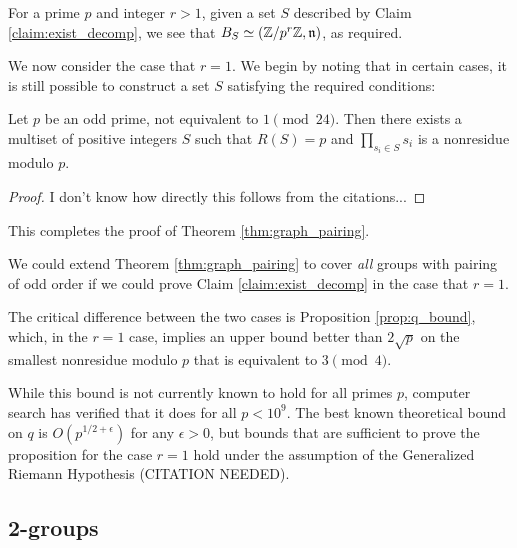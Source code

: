 \documentclass{amsart}
\begin{document}
For a prime $p$ and integer $r > 1$, given a set $S$ described by
Claim \ref{claim:exist_decomp}, we see that $B_S \simeq (\mathbb{Z}/p^r\mathbb{Z},
\mathfrak{n})$, as required.

We now consider the case that $r=1$. We begin by noting that in
certain cases, it is still possible to construct a set $S$
satisfying the required conditions:
\begin{prop}
  Let $p$ be an odd prime, not equivalent to $1 \pmod {24}$. Then
  there exists a multiset of positive integers $S$ such that $R(S) =
  p$ and $\prod_{s_i \in S}s_i$ is a nonresidue modulo $p$.
\end{prop}
\begin{proof}
  I don't know how directly this follows from the citations...
\end{proof}

This completes the proof of Theorem \ref{thm:graph_pairing}.

\begin{remark} We could extend Theorem \ref{thm:graph_pairing} to
  cover \emph{all} groups with pairing of odd order if we could prove
  Claim \ref{claim:exist_decomp} in the case that $r=1$.
  
  The critical difference between the two cases is Proposition
  \ref{prop:q_bound}, which, in the $r=1$ case, implies an upper bound
  better than $2\sqrt{p}$ on the smallest nonresidue modulo $p$ that
  is equivalent to $3 \pmod 4$.

  While this bound is not currently known to hold for all primes $p$,
  computer search has verified that it does for all $p < 10^9$. The
  best known theoretical bound on $q$ is $O(p^{1/2 + \epsilon})$ for
  any $\epsilon > 0$, but bounds that are sufficient to prove the
  proposition for the case $r=1$ hold under the assumption of the
  Generalized Riemann Hypothesis (CITATION NEEDED).
\end{remark}

\subsection{2-groups}
\end{document}
